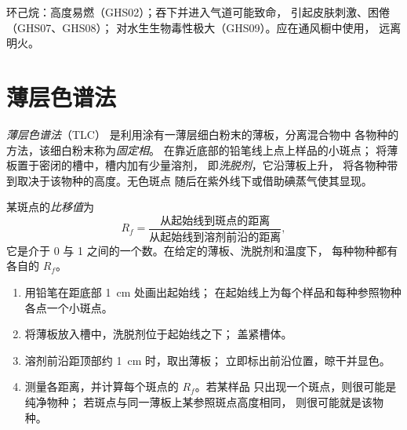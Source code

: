 \begin{safety}{}
环己烷：高度易燃（GHS02）；吞下并进入气道可能致命，
引起皮肤刺激、困倦（GHS07、GHS08）；
对水生生物毒性极大（GHS09）。应在通风橱中使用，
远离明火。
\end{safety}

\section{薄层色谱法}

\begin{definition}[薄层色谱法]\label{def:g10:chemical-species:tlc}
\emph{薄层色谱法}（TLC）
是利用涂有一薄层细白粉末的薄板，分离混合物中
各物种的方法，该细白粉末称为\emph{固定相}。
在靠近底部的铅笔线上点上样品的小斑点；
将薄板置于密闭的槽中，槽内加有少量溶剂，
即\emph{洗脱剂}，它沿薄板上升，
将各物种带到取决于该物种的高度。无色斑点
随后在紫外线下或借助碘蒸气使其显现。
\end{definition}

\begin{definition}[比移值]\label{def:g10:chemical-species:retention-factor}
某斑点的\emph{比移值}为
\[
  R_f = \frac{\text{从起始线到斑点的距离}}
             {\text{从起始线到溶剂前沿的距离}},
\]
它是介于 0 与 1 之间的一个数。在给定的薄板、洗脱剂和温度下，
每种物种都有各自的 $R_f$。
\end{definition}

\begin{method}[薄层色谱的操作与读数]\label{met:g10:chemical-species:tlc}
\begin{enumerate}
  \item 用铅笔在距底部 \qty{1}{cm} 处画出起始线；
        在起始线上为每个样品和每种参照物种
        各点一个小斑点。
  \item 将薄板放入槽中，洗脱剂位于起始线之下；
        盖紧槽体。
  \item 溶剂前沿距顶部约 \qty{1}{cm} 时，取出薄板；
        立即标出前沿位置，晾干并显色。
  \item 测量各距离，并计算每个斑点的 $R_f$。若某样品
        只出现一个斑点，则很可能是纯净物种；
        若斑点与同一薄板上某参照斑点高度相同，
        则很可能就是该物种。
\end{enumerate}
\end{method}

